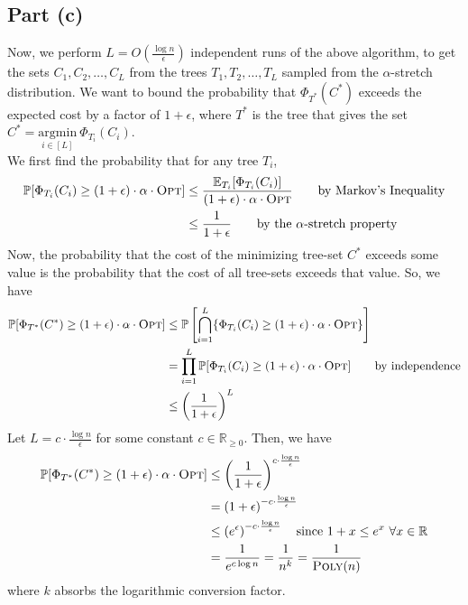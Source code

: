 \documentclass[9pt]{article}
\begin{document}
\subsection*{Part (c)}
Now, we perform $L = O \left( \frac{\log{n}}{\epsilon} \right)$ independent runs of the above
algorithm, to get the sets $C_{1}, C_{2}, \ldots, C_{L}$ from the trees
$T_{1}, T_{2}, \ldots, T_{L}$ sampled from the $\alpha$-stretch distribution. We want to
bound the probability that $\Phi_{T^{*}}(C^{*})$ exceeds the expected cost by a factor of
$1 + \epsilon$, where $T^{*}$ is the tree that gives the set
$C^{*} = \underset{i \in [L]}{\text{argmin}} \ \Phi_{T_{i}}(C_{i})$. \\
We first find the probability that for any tree $T_{i}$,
\begin{align}
    \begin{split}
        \mathbb{P}[\Phi_{T_{i}}(C_{i}) \geq (1 + \epsilon) \cdot \alpha \cdot \textsc{Opt}]
        &\leq \frac{\mathbb{E}_{T_{i}}[\Phi_{T_{i}}(C_{i})]}{(1 + \epsilon) \cdot \alpha \cdot \textsc{Opt}}
        \qquad \text{by Markov's Inequality} \\
        &\leq \frac{1}{1 + \epsilon} \qquad \text{by the $\alpha$-stretch property}
    \end{split}
\end{align}
Now, the probability that the cost of the minimizing tree-set $C^{*}$ exceeds some value is the
probability that the cost of all tree-sets exceeds that value. So, we have
\begin{align}
    \begin{split}
        \mathbb{P}[\Phi_{T^{*}}(C^{*}) \geq (1 + \epsilon) \cdot \alpha \cdot \textsc{Opt}]
        &\leq \mathbb{P} \left[ \bigcap_{i=1}^{L} \{ \Phi_{T_{i}}(C_{i}) \geq (1 + \epsilon) \cdot \alpha \cdot \textsc{Opt} \} \right] \\
        &= \prod_{i=1}^{L} \mathbb{P}[\Phi_{T_{i}}(C_{i}) \geq (1 + \epsilon) \cdot \alpha \cdot \textsc{Opt}]
        \qquad \text{by independence} \\
        &\leq \left( \frac{1}{1 + \epsilon} \right)^{L}
    \end{split}
\end{align}
Let $L = c \cdot \frac{\log{n}}{\epsilon}$ for some constant $c \in \mathbb{R}_{\geq 0}$.
Then, we have
\begin{align}
    \begin{split}
        \mathbb{P}[\Phi_{T^{*}}(C^{*}) \geq (1 + \epsilon) \cdot \alpha \cdot \textsc{Opt}]
        &\leq \left( \frac{1}{1 + \epsilon} \right)^{c \cdot \frac{\log{n}}{\epsilon}} \\
        &= \left( 1 + \epsilon \right)^{-c \cdot \frac{\log{n}}{\epsilon}} \\
        &\leq \left( e^{\epsilon} \right)^{-c \cdot \frac{\log{n}}{\epsilon}} \quad \text{since }
        1 + x \leq e^{x} \ \forall x \in \mathbb{R} \\
        &= \frac{1}{e^{c \log{n}}} = \frac{1}{n^{k}} = \frac{1}{\textsc{Poly}(n)}
    \end{split}
\end{align}
where $k$ absorbs the logarithmic conversion factor.
\end{document}
